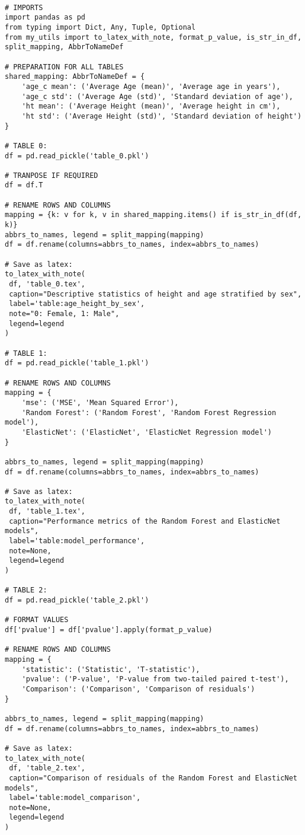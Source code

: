 \documentclass[11pt]{article}
\begin{document}
\begin{verbatim}

# IMPORTS
import pandas as pd
from typing import Dict, Any, Tuple, Optional
from my_utils import to_latex_with_note, format_p_value, is_str_in_df, split_mapping, AbbrToNameDef

# PREPARATION FOR ALL TABLES
shared_mapping: AbbrToNameDef = {
    'age_c mean': ('Average Age (mean)', 'Average age in years'),
    'age_c std': ('Average Age (std)', 'Standard deviation of age'),
    'ht mean': ('Average Height (mean)', 'Average height in cm'),
    'ht std': ('Average Height (std)', 'Standard deviation of height')
}

# TABLE 0:
df = pd.read_pickle('table_0.pkl')

# TRANPOSE IF REQUIRED
df = df.T

# RENAME ROWS AND COLUMNS
mapping = {k: v for k, v in shared_mapping.items() if is_str_in_df(df, k)}
abbrs_to_names, legend = split_mapping(mapping)
df = df.rename(columns=abbrs_to_names, index=abbrs_to_names)

# Save as latex:
to_latex_with_note(
 df, 'table_0.tex',
 caption="Descriptive statistics of height and age stratified by sex", 
 label='table:age_height_by_sex',
 note="0: Female, 1: Male",
 legend=legend
)

# TABLE 1:
df = pd.read_pickle('table_1.pkl')

# RENAME ROWS AND COLUMNS
mapping = {
    'mse': ('MSE', 'Mean Squared Error'),
    'Random Forest': ('Random Forest', 'Random Forest Regression model'),
    'ElasticNet': ('ElasticNet', 'ElasticNet Regression model')
}

abbrs_to_names, legend = split_mapping(mapping)
df = df.rename(columns=abbrs_to_names, index=abbrs_to_names)

# Save as latex:
to_latex_with_note(
 df, 'table_1.tex',
 caption="Performance metrics of the Random Forest and ElasticNet models", 
 label='table:model_performance',
 note=None,
 legend=legend
)

# TABLE 2:
df = pd.read_pickle('table_2.pkl')

# FORMAT VALUES
df['pvalue'] = df['pvalue'].apply(format_p_value)

# RENAME ROWS AND COLUMNS
mapping = {
    'statistic': ('Statistic', 'T-statistic'),
    'pvalue': ('P-value', 'P-value from two-tailed paired t-test'),
    'Comparison': ('Comparison', 'Comparison of residuals')
}

abbrs_to_names, legend = split_mapping(mapping)
df = df.rename(columns=abbrs_to_names, index=abbrs_to_names)

# Save as latex:
to_latex_with_note(
 df, 'table_2.tex',
 caption="Comparison of residuals of the Random Forest and ElasticNet models", 
 label='table:model_comparison',
 note=None,
 legend=legend
)

\end{verbatim}
\end{document}
